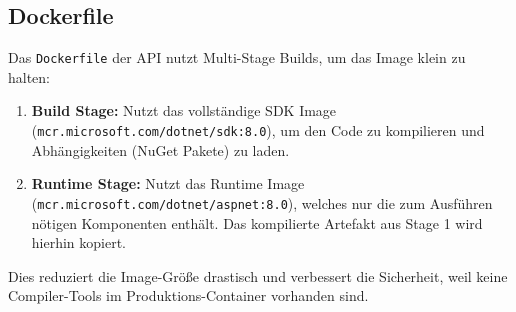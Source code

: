 \subsection{Dockerfile}
Das \texttt{Dockerfile} der API nutzt Multi-Stage Builds, um das Image klein zu halten:
\begin{enumerate}
    \item \textbf{Build Stage:} Nutzt das vollständige SDK Image (\texttt{mcr.microsoft.com/dotnet/sdk:8.0}), um den Code zu kompilieren und Abhängigkeiten (NuGet Pakete) zu laden.
    \item \textbf{Runtime Stage:} Nutzt das Runtime Image (\texttt{mcr.microsoft.com/dotnet/aspnet:8.0}), welches nur die zum Ausführen nötigen Komponenten enthält. Das kompilierte Artefakt aus Stage 1 wird hierhin kopiert.
\end{enumerate}
Dies reduziert die Image-Größe drastisch und verbessert die Sicherheit, weil keine Compiler-Tools im Produktions-Container vorhanden sind.
